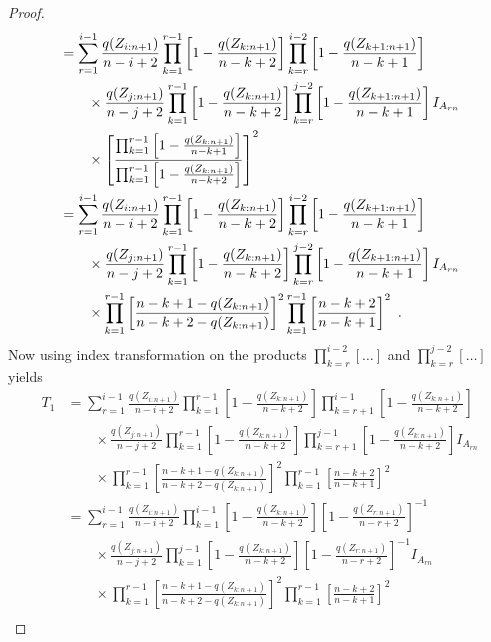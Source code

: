 \begin{proof}
\begin{align*}
		&= \sum\limits_{r=1}^{i-1} \frac{q(Z_{i:n+1})}{n-i+2} \prod_{k=1}^{r-1}\left[1-\frac{q(Z_{k:n+1})}{n-k+2}\right]\prod_{k=r}^{i-2}\left[1-\frac{q(Z_{k+1:n+1})}{n-k+1}\right]\\
		& \qquad \times \frac{q(Z_{j:n+1})}{n-j+2} \prod_{k=1}^{r-1}\left[1-\frac{q(Z_{k:n+1})}{n-k+2}\right]\prod_{k=r}^{j-2}\left[1-\frac{q(Z_{k+1:n+1})}{n-k+1}\right]I_{A_{rn}}\\
		& \qquad \times \left[\frac{\prod_{k=1}^{r-1}\left[1-\frac{q(Z_{k:n+1})}{n-k+1}\right]}{\prod_{k=1}^{r-1}\left[1-\frac{q(Z_{k:n+1})}{n-k+2}\right]}\right]^2\\
		&= \sum\limits_{r=1}^{i-1} \frac{q(Z_{i:n+1})}{n-i+2} \prod_{k=1}^{r-1}\left[1-\frac{q(Z_{k:n+1})}{n-k+2}\right]\prod_{k=r}^{i-2}\left[1-\frac{q(Z_{k+1:n+1})}{n-k+1}\right]\\
		& \qquad \times \frac{q(Z_{j:n+1})}{n-j+2} \prod_{k=1}^{r-1}\left[1-\frac{q(Z_{k:n+1})}{n-k+2}\right]\prod_{k=r}^{j-2}\left[1-\frac{q(Z_{k+1:n+1})}{n-k+1}\right]I_{A_{rn}}\\
		& \qquad \times \prod_{k=1}^{r-1}\left[ \frac{n-k+1-q(Z_{k:n+1})}{n-k+2-q(Z_{k:n+1})}\right]^2\prod_{k=1}^{r-1}\left[ \frac{n-k+2}{n-k+1}\right]^2\textrm{ .}
\end{align*}
%
Now using index transformation on the products $\prod_{k=r}^{i-2}[\ldots]$ and $\prod_{k=r}^{j-2}[\ldots]$ yields
\begin{align*}		
	T_1 &= \sum\limits_{r=1}^{i-1} \frac{q(Z_{i:n+1})}{n-i+2} \prod_{k=1}^{r-1}\left[1-\frac{q(Z_{k:n+1})}{n-k+2}\right]\prod_{k=r+1}^{i-1}\left[1-\frac{q(Z_{k:n+1})}{n-k+2}\right]\\
	& \qquad \times \frac{q(Z_{j:n+1})}{n-j+2} \prod_{k=1}^{r-1}\left[1-\frac{q(Z_{k:n+1})}{n-k+2}\right]\prod_{k=r+1}^{j-1}\left[1-\frac{q(Z_{k:n+1})}{n-k+2}\right]I_{A_{rn}}\\
	& \qquad \times \prod_{k=1}^{r-1}\left[ \frac{n-k+1-q(Z_{k:n+1})}{n-k+2-q(Z_{k:n+1})}\right]^2\prod_{k=1}^{r-1}\left[ \frac{n-k+2}{n-k+1}\right]^2\\
    &= \sum\limits_{r=1}^{i-1} \frac{q(Z_{i:n+1})}{n-i+2} \prod_{k=1}^{i-1}\left[1-\frac{q(Z_{k:n+1})}{n-k+2}\right]\left[1-\frac{q(Z_{r:n+1})}{n-r+2}\right]^{-1}\\
	& \qquad \times \frac{q(Z_{j:n+1})}{n-j+2} \prod_{k=1}^{j-1}\left[1-\frac{q(Z_{k:n+1})}{n-k+2}\right]\left[1-\frac{q(Z_{r:n+1})}{n-r+2}\right]^{-1}I_{A_{rn}}\\
	& \qquad \times \prod_{k=1}^{r-1}\left[ \frac{n-k+1-q(Z_{k:n+1})}{n-k+2-q(Z_{k:n+1})}\right]^2\prod_{k=1}^{r-1}\left[ \frac{n-k+2}{n-k+1}\right]^2\\

\end{align*}
\end{proof}

